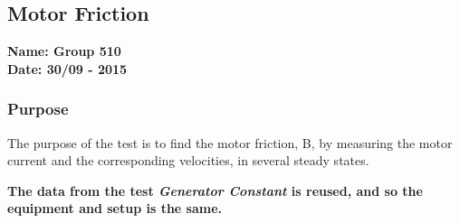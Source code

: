 \pagebreak
\subsection{Motor Friction} %
\textbf{Name: Group 510}\\
\textbf{Date: 30/09 - 2015}

\subsubsection{Purpose}
The purpose of the test is to find the motor friction, B, by measuring the motor current and the corresponding velocities, in several steady states.

\textbf{The data from the test \textit{Generator Constant} is reused, and so the equipment and setup is the same.}

